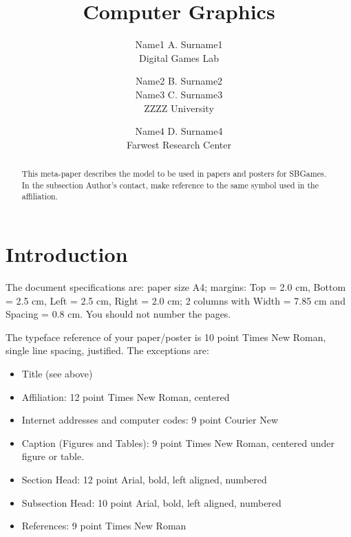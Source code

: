 \documentclass[a4paper]{sbgames}               %
\title{Computer Graphics}
\author{Name1 A. Surname1\\ Digital Games Lab 
        \and Name2 B. Surname2\\ Name3 C. Surname3\\ ZZZZ University
        \and Name4 D. Surname4\\ Farwest Research Center 
}
\begin{document}


\maketitle


\begin{abstract}

  This meta-paper describes the model to be used in papers and posters
  for SBGames. In the subsection Author's contact, make reference to
  the same symbol used in the affiliation.
\end{abstract}

\keywordlist
\contactlist

\section{Introduction}

The document specifications are: paper size A4; margins: Top = 2.0 cm,
Bottom = 2.5 cm, Left = 2.5 cm, Right = 2.0 cm; 2 columns with Width =
7.85 cm and Spacing = 0.8 cm. You should not number the pages.

The typeface reference of your paper/poster is 10 point Times New
Roman, single line spacing, justified. The exceptions are:

\begin{itemize}

\item Title (see above)
\item Affiliation: 12 point Times New Roman, centered
\item Internet addresses and computer codes: 9 point Courier New
\item Caption (Figures and Tables): 9 point Times New Roman, centered under figure or table.
\item Section Head: 12 point Arial, bold, left aligned, numbered
\item Subsection Head: 10 point Arial, bold, left aligned, numbered
\item References: 9 point Times New Roman
\end{itemize}
\end{document}
